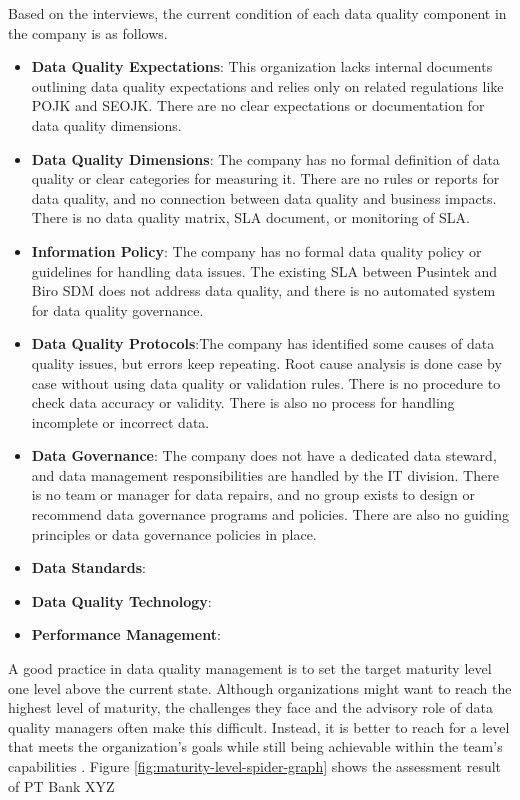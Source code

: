 \documentclass[conference]{IEEEtran}
\begin{document}
Based on the interviews, the current condition of each data quality component in the company is as follows.
\begin{itemize}
\item \textbf{Data Quality Expectations}: This organization lacks internal documents outlining data quality expectations and relies only on related regulations like POJK and SEOJK. There are no clear expectations or documentation for data quality dimensions.
\item \textbf{Data Quality Dimensions}: The company has no formal definition of data quality or clear categories for measuring it. There are no rules or reports for data quality, and no connection between data quality and business impacts. There is no data quality matrix, SLA document, or monitoring of SLA.
\item \textbf{Information Policy}: The company has no formal data quality policy or guidelines for handling data issues. The existing SLA between Pusintek and Biro SDM does not address data quality, and there is no automated system for data quality governance.
\item \textbf{Data Quality Protocols}:The company has identified some causes of data quality issues, but errors keep repeating. Root cause analysis is done case by case without using data quality or validation rules. There is no procedure to check data accuracy or validity. There is also no process for handling incomplete or incorrect data.
\item \textbf{Data Governance}: The company does not have a dedicated data steward, and data management responsibilities are handled by the IT division. There is no team or manager for data repairs, and no group exists to design or recommend data governance programs and policies. There are also no guiding principles or data governance policies in place.
\item \textbf{Data Standards}: \lipsum[1] 
\item \textbf{Data Quality Technology}: \lipsum[1] 
\item \textbf{Performance Management}: \lipsum[1] 
\end{itemize}


A good practice in data quality management is to set the target maturity level one level above the current state. Although organizations might want to reach the highest level of maturity, the challenges they face and the advisory role of data quality managers often make this difficult. Instead, it is better to reach for a level that meets the organization's goals while still being achievable within the team’s capabilities \cite{loshin_dqi}. Figure \ref{fig:maturity-level-spider-graph} shows the assessment result of PT Bank XYZ
\end{document}

